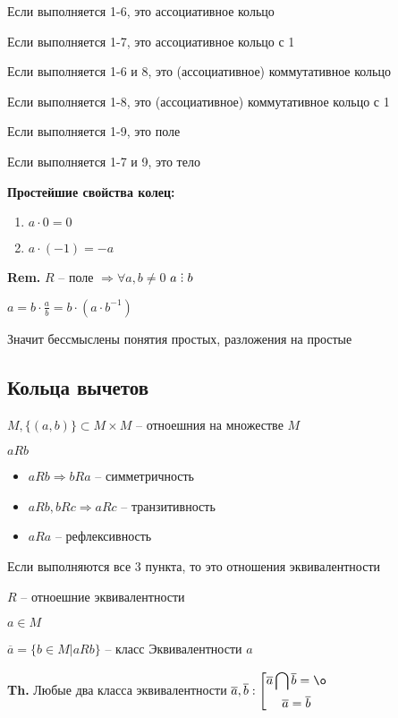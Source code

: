 \documentclass[14pt, letter paper]{article}
\def\divby{%
  \mathrel{\text{\vbox{\baselineskip.65ex\lineskiplimit0pt\hbox{.}\hbox{.}\hbox{.}}}}%
}
\begin{document}
Если выполняется 1-6, это ассоциативное кольцо

Если выполняется 1-7, это ассоциативное кольцо с 1

Если выполняется 1-6 и 8, это (ассоциативное) коммутативное кольцо

Если выполняется 1-8, это (ассоциативное) коммутативное кольцо с 1

Если выполняется 1-9, это поле

Если выполняется 1-7 и 9, это тело

\textbf{Простейшие свойства колец:}

\begin{enumerate}
    \item $a \cdot 0 = 0$
    \item $a \cdot (-1) = -a$
\end{enumerate}

\textbf{Rem.} $R$ -- поле $\Rightarrow \forall a, b \neq 0$ $a \divby b$

$a = b \cdot \frac{a}{b} = b \cdot (a \cdot b^{-1})$

Значит бессмыслены понятия простых, разложения на простые

\begin{center}
    \section*{Кольца вычетов}
\end{center}

$M, \{ (a, b) \} \subset M \times M$ -- отноешния на множестве $M$

$aRb$

\begin{itemize}
    \item $aRb \Rightarrow bRa$ -- симметричность
    \item $aRb, bRc \Rightarrow aRc$ -- транзитивность
    \item $aRa$ -- рефлексивность
\end{itemize}

Если выполняются все 3 пункта, то это отношения эквивалентности

$R$ -- отноешние эквивалентности

$a \in M$

$\overline{a} = \{b \in M | aRb \}$ -- класс Эквивалентности $a$

\textbf{Th.} Любые два класса эквивалентности $\overline{a}, \overline{b} : \left[ \begin{gathered}
    \overline{a} \bigcap \overline{b} = \o \\
    \overline{a} = \overline{b}
\end{gathered} \right.$
\end{document}
